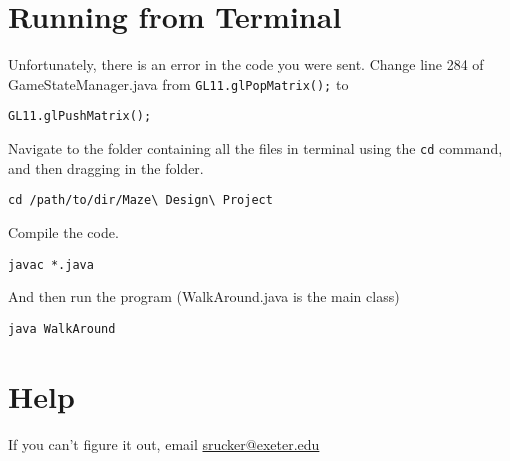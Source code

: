 \documentclass[12pt]{article}
\begin{document}
\section{Running from Terminal}
Unfortunately, there is an error in the code you were sent. Change line 284 of GameStateManager.java
from \texttt{GL11.glPopMatrix();} to 
\begin{verbatim}
GL11.glPushMatrix();
\end{verbatim}
Navigate to the folder containing all the files in terminal using the \texttt{cd} command, and then dragging in the folder.
\begin{verbatim}
cd /path/to/dir/Maze\ Design\ Project
\end{verbatim} 
Compile the code.
\begin{verbatim}
javac *.java
\end{verbatim} 
And then run the program (WalkAround.java is the main class)
\begin{verbatim}
java WalkAround
\end{verbatim} 
\section{Help}
If you can't figure it out, email \url{srucker@exeter.edu}
\end{document}
